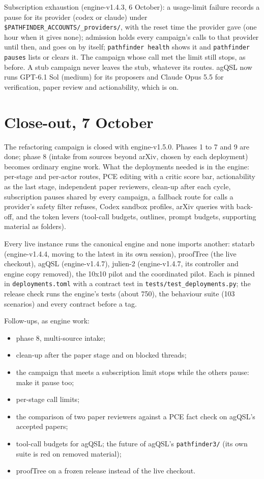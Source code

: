 \documentclass[11pt,a4paper]{article}
\begin{document}
Subscription exhaustion (engine-v1.4.3, 6 October): a usage-limit failure records a pause for its provider (codex or claude) under \texttt{\$PATHFINDER\_ACCOUNTS/\_providers/}, with the reset time the provider gave (one hour when it gives none); admission holds every campaign's calls to that provider until then, and goes on by itself; \texttt{pathfinder health} shows it and \texttt{pathfinder pauses} lists or clears it. The campaign whose call met the limit still stops, as before. A stub campaign never leaves the stub, whatever its routes. agQSL now runs GPT-6.1 Sol (medium) for its proposers and Claude Opus 5.5 for verification, paper review and actionability, which is on.

\section{Close-out, 7 October}\label{sec:closeout}

The refactoring campaign is closed with engine-v1.5.0. Phases 1 to 7 and 9 are done; phase 8 (intake from sources
beyond arXiv, chosen by each deployment) becomes ordinary engine work. What the deployments needed is in the
engine: per-stage and per-actor routes, PCE editing with a critic score bar, actionability as the last stage,
independent paper reviewers, clean-up after each cycle, subscription pauses shared by every campaign, a fallback
route for calls a provider's safety filter refuses, Codex sandbox profiles, arXiv queries with back-off, and the
token levers (tool-call budgets, outlines, prompt budgets, supporting material as folders).

Every live instance runs the canonical engine and none imports another: statarb (engine-v1.4.4, moving to the
latest in its own session), proofTree (the live checkout), agQSL (engine-v1.4.7), julien-2 (engine-v1.4.7, its
controller and engine copy removed), the 10x10 pilot and the coordinated pilot. Each is pinned in
\texttt{deployments.toml} with a contract test in \texttt{tests/test\_deployments.py}; the release check runs the
engine's tests (about 750), the behaviour suite (103 scenarios) and every contract before a tag.

Follow-ups, as engine work:
\begin{itemize}
\item phase 8, multi-source intake;
\item clean-up after the paper stage and on blocked threads;
\item the campaign that meets a subscription limit stops while the others pause: make it pause too;
\item per-stage call limits;
\item the comparison of two paper reviewers against a PCE fact check on agQSL's accepted papers;
\item tool-call budgets for agQSL; the future of agQSL's \texttt{pathfinder3/} (its own suite is red on removed
  material);
\item proofTree on a frozen release instead of the live checkout.
\end{itemize}
\end{document}
